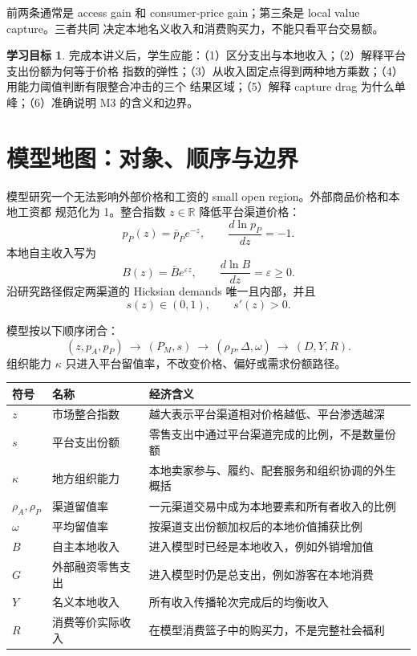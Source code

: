 \documentclass[UTF8,11pt,scheme=chinese,fontset=windows]{ctexart}
\theoremstyle{definition}
\newtheorem{learninggoal}{学习目标}[section]
\begin{document}
前两条通常是 access gain 和 consumer-price gain；第三条是 local value capture。三者共同
决定本地名义收入和消费购买力，不能只看平台交易额。

\begin{learninggoal}
完成本讲义后，学生应能：（1）区分支出与本地收入；（2）解释平台支出份额为何等于价格
指数的弹性；（3）从收入固定点得到两种地方乘数；（4）用能力阈值判断有限整合冲击的三个
结果区域；（5）解释 capture drag 为什么单峰；（6）准确说明 M3 的含义和边界。
\end{learninggoal}

\section{模型地图：对象、顺序与边界}

模型研究一个无法影响外部价格和工资的 small open region。外部商品价格和本地工资都
规范化为 1。整合指数 \(z\in\mathbb R\) 降低平台渠道价格：
\[
p_P(z)=\bar p_Pe^{-z},
\qquad \frac{d\ln p_P}{dz}=-1.
\]
本地自主收入写为
\[
B(z)=\bar Be^{\varepsilon z},
\qquad \frac{d\ln B}{dz}=\varepsilon\geq0.
\]
沿研究路径假定两渠道的 Hicksian demands 唯一且内部，并且
\[
s(z)\in(0,1),\qquad s'(z)>0.
\]

模型按以下顺序闭合：
\[
\boxed{
(z,p_A,p_P)\ \longrightarrow\ (P_M,s)\ \longrightarrow\
(\rho_P,\Delta,\omega)\ \longrightarrow\ (D,Y,R).}
\]
组织能力 \(\kappa\) 只进入平台留值率，不改变价格、偏好或需求份额路径。

\begin{center}
\small
\begin{tabularx}{\textwidth}{>{\centering\arraybackslash}p{1.8cm}p{3.4cm}X}
\toprule
符号 & 名称 & 经济含义 \\
\midrule
\(z\) & 市场整合指数 & 越大表示平台渠道相对价格越低、平台渗透越深 \\
\(s\) & 平台支出份额 & 零售支出中通过平台渠道完成的比例，不是数量份额 \\
\(\kappa\) & 地方组织能力 & 本地卖家参与、履约、配套服务和组织协调的外生概括 \\
\(\rho_A,\rho_P\) & 渠道留值率 & 一元渠道交易中成为本地要素和所有者收入的比例 \\
\(\omega\) & 平均留值率 & 按渠道支出份额加权后的本地价值捕获比例 \\
\(B\) & 自主本地收入 & 进入模型时已经是本地收入，例如外销增加值 \\
\(G\) & 外部融资零售支出 & 进入模型时仍是总支出，例如游客在本地消费 \\
\(Y\) & 名义本地收入 & 所有收入传播轮次完成后的均衡收入 \\
\(R\) & 消费等价实际收入 & 在模型消费篮子中的购买力，不是完整社会福利 \\
\bottomrule
\end{tabularx}
\end{center}
\normalsize
\end{document}
